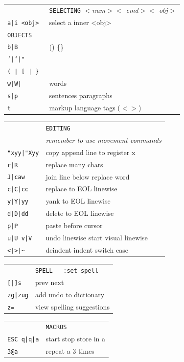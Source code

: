 \documentclass[a4paper,12pt]{article}
\begin{document}
\begin{multicols}{2}
\vfill

\begin{tabular}{ll}
&\texttt{SELECTING} \emph{$<$num$><$ cmd$><$ obj$>$}\\
\texttt{a|i <obj>}& select a \textbar{} inner <obj>\\
\texttt{OBJECTS}&\\
\texttt{b|B}&() \textbar{} \{\} \\
\texttt{'|`|"}&\\
\texttt{( | [ | \} }&\\
\texttt{w|W|}&words\\
\texttt{s|p}&sentences \textbar{} paragraphs\\
\texttt{t}&markup language tags ($<>$) \\
\end{tabular}

\vfill

\begin{tabular}{ll}
&\texttt{EDITING}\\
&\emph{remember to use movement commands}\\
\texttt{"xyy|"Xyy}&copy \textbar{} append line to register x\\
\texttt{r|R}& replace \textbar{} many chars\\
\texttt{J|caw}& join line below \textbar{} replace word\\
\texttt{c|C|cc}& replace \textbar{} to EOL \textbar{} linewise\\
\texttt{y|Y|yy}& yank \textbar{} to EOL \textbar{} linewise\\
\texttt{d|D|dd}& delete \textbar{} to EOL \textbar{} linewise\\
\texttt{p|P}& paste \textbar{} before cursor\\
\texttt{u|U v|V}& undo \textbar{} linewise start visual \textbar{} linewise\\
\texttt{<|>|\~}& deindent \textbar{} indent \textbar{} switch case\\
\end{tabular}

\vfill

\begin{tabular}{ll}
&\texttt{SPELL\ \ \ :set spell}\\
\texttt{[|]s}&prev \textbar{} next\\
\texttt{zg|zug}&add \textbar{} undo to dictionary\\
\texttt{z=}&view spelling suggestions\\
\end{tabular}
\vfill
\begin{tabular}{ll}
&\texttt{MACROS}\\
\texttt{ESC q|q|a}&start \textbar{} stop \textbar{} store in a\\
\texttt{3@a}&repeat a 3 times\\
\end{tabular}


\end{multicols}
\end{document}
